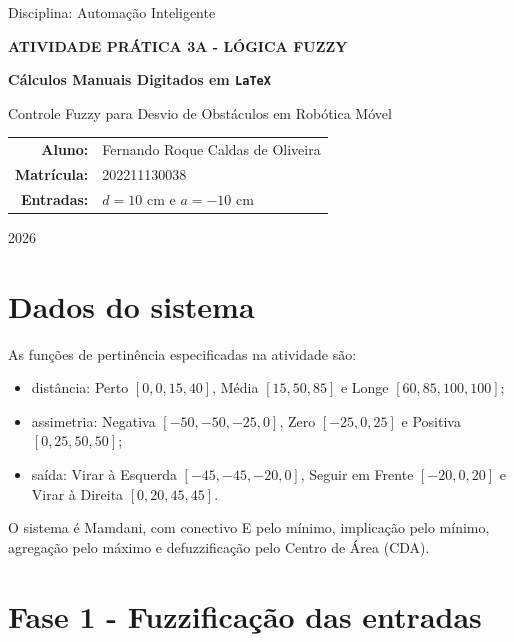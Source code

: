 \documentclass[12pt,a4paper]{article}
\begin{document}
\hypersetup{pageanchor=false}
\begin{titlepage}
  \centering
  {\large Disciplina: Automação Inteligente\par}
  \vspace{2cm}
  {\Large\bfseries ATIVIDADE PRÁTICA 3A - LÓGICA FUZZY\par}
  \vspace{0.7cm}
  {\LARGE\bfseries Cálculos Manuais Digitados em \texttt{LaTeX}\par}
  \vspace{0.8cm}
  {\Large Controle Fuzzy para Desvio de Obstáculos em Robótica Móvel\par}
  \vfill
  \begin{tabular}{rl}
    \textbf{Aluno:} & Fernando Roque Caldas de Oliveira \\
    \textbf{Matrícula:} & 202211130038 \\
    \textbf{Entradas:} & $d=10$ cm e $a=-10$ cm
  \end{tabular}
  \vfill
  {\large 2026\par}
\end{titlepage}

\hypersetup{pageanchor=true}

\section{Dados do sistema}

As funções de pertinência especificadas na atividade são:

\begin{itemize}
  \item distância: Perto $[0,0,15,40]$, Média $[15,50,85]$ e Longe $[60,85,100,100]$;
  \item assimetria: Negativa $[-50,-50,-25,0]$, Zero $[-25,0,25]$ e Positiva $[0,25,50,50]$;
  \item saída: Virar à Esquerda $[-45,-45,-20,0]$, Seguir em Frente $[-20,0,20]$ e Virar à Direita $[0,20,45,45]$.
\end{itemize}

O sistema é Mamdani, com conectivo E pelo mínimo, implicação pelo mínimo,
agregação pelo máximo e defuzzificação pelo Centro de Área (CDA).

\section{Fase 1 - Fuzzificação das entradas}
\end{document}
